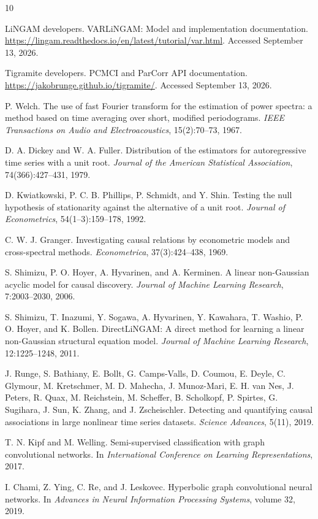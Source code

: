 \documentclass[11pt,a4paper]{article}
\begin{document}
\begin{thebibliography}{10}

LiNGAM developers.
\newblock VARLiNGAM: Model and implementation documentation.
\newblock \url{https://lingam.readthedocs.io/en/latest/tutorial/var.html}.
Accessed September 13, 2026.

Tigramite developers.
\newblock PCMCI and ParCorr API documentation.
\newblock \url{https://jakobrunge.github.io/tigramite/}.
Accessed September 13, 2026.

P. Welch.
\newblock The use of fast Fourier transform for the estimation of power
spectra: a method based on time averaging over short, modified periodograms.
\newblock \emph{IEEE Transactions on Audio and Electroacoustics},
15(2):70--73, 1967.

D. A. Dickey and W. A. Fuller.
\newblock Distribution of the estimators for autoregressive time series with a
unit root.
\newblock \emph{Journal of the American Statistical Association},
74(366):427--431, 1979.

D. Kwiatkowski, P. C. B. Phillips, P. Schmidt, and Y. Shin.
\newblock Testing the null hypothesis of stationarity against the alternative
of a unit root.
\newblock \emph{Journal of Econometrics}, 54(1--3):159--178, 1992.

C. W. J. Granger.
\newblock Investigating causal relations by econometric models and
cross-spectral methods.
\newblock \emph{Econometrica}, 37(3):424--438, 1969.

S. Shimizu, P. O. Hoyer, A. Hyvarinen, and A. Kerminen.
\newblock A linear non-Gaussian acyclic model for causal discovery.
\newblock \emph{Journal of Machine Learning Research}, 7:2003--2030, 2006.

S. Shimizu, T. Inazumi, Y. Sogawa, A. Hyvarinen, Y. Kawahara, T. Washio,
P. O. Hoyer, and K. Bollen.
\newblock DirectLiNGAM: A direct method for learning a linear non-Gaussian
structural equation model.
\newblock \emph{Journal of Machine Learning Research}, 12:1225--1248, 2011.

J. Runge, S. Bathiany, E. Bollt, G. Camps-Valls, D. Coumou, E. Deyle,
C. Glymour, M. Kretschmer, M. D. Mahecha, J. Munoz-Mari, E. H. van Nes,
J. Peters, R. Quax, M. Reichstein, M. Scheffer, B. Scholkopf, P. Spirtes,
G. Sugihara, J. Sun, K. Zhang, and J. Zscheischler.
\newblock Detecting and quantifying causal associations in large nonlinear
time series datasets.
\newblock \emph{Science Advances}, 5(11), 2019.

T. N. Kipf and M. Welling.
\newblock Semi-supervised classification with graph convolutional networks.
\newblock In \emph{International Conference on Learning Representations},
2017.

I. Chami, Z. Ying, C. Re, and J. Leskovec.
\newblock Hyperbolic graph convolutional neural networks.
\newblock In \emph{Advances in Neural Information Processing Systems},
volume 32, 2019.

\end{thebibliography}
\end{document}
